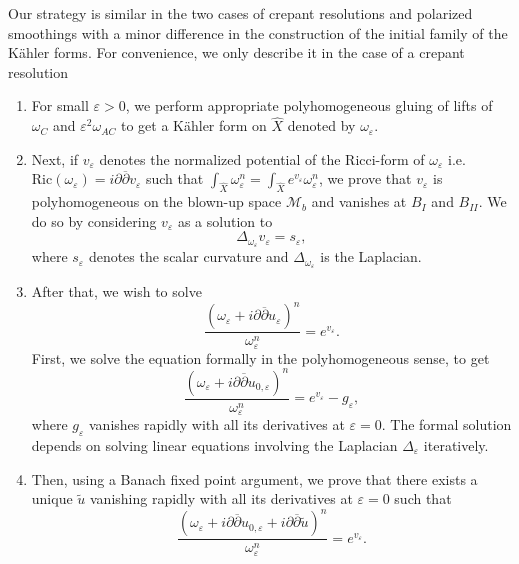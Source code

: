 \documentclass[a4paper,11pt]{article}
\begin{document}
Our strategy is similar in the two cases of crepant resolutions and polarized smoothings with a minor difference in the construction of the initial family of the Kähler forms. For convenience, we only describe it in the case of a crepant resolution 
 \begin{enumerate}
     \item For small $\varepsilon>0$, we perform appropriate polyhomogeneous gluing of lifts of $\omega_C$ and $\varepsilon^2 \omega_{AC}$ to get a Kähler form on $\hat{X}$ denoted by $\omega_\varepsilon$. 
     \item Next, if $v_\varepsilon$ denotes the normalized potential of the Ricci-form of $\omega_\varepsilon$ i.e. $\mathrm{Ric}(\omega_\varepsilon) = i \partial \overline{\partial} v_\varepsilon$ such that $\int_{\hat{X}} \omega_\varepsilon^n = \int_{\hat{X}} e^{v_\varepsilon} \omega_\varepsilon^n$,
     we prove that $v_\varepsilon$ is polyhomogeneous on the blown-up space $\mathcal{M}_b$ and vanishes at $B_I$ and $B_{II}$. We do so by considering $v_\varepsilon$ as a solution to
     $$
     \Delta_{\omega_{\varepsilon}} v_\varepsilon = s_{\varepsilon},
     $$
     where $s_{\varepsilon}$ denotes the scalar curvature and $\Delta_{\omega_\varepsilon}$ is the Laplacian.
     \item  After that, we wish to solve
     $$
     \frac{(\omega_\varepsilon + i \partial \overline{\partial} u_\varepsilon)^n}{\omega_\varepsilon^n} = e^{v_\varepsilon}. 
     $$
     First, we solve the equation formally in the polyhomogeneous sense, to get 
     $$
     \frac{(\omega_\varepsilon + i \partial \overline{\partial} u_{0,\varepsilon})^n}{\omega_\varepsilon^n} = e^{v_\varepsilon}-g_\varepsilon, 
     $$
     where $g_\varepsilon$ vanishes rapidly with all its derivatives at $\varepsilon=0$. The formal solution depends on solving linear equations involving the Laplacian $\Delta_\varepsilon$ iteratively.  
     \item Then, using a Banach fixed point argument, we prove that there exists a unique $\tilde u$ vanishing rapidly with all its derivatives at $\varepsilon=0$ such that 
     $$
     \frac{(\omega_\varepsilon + i \partial \overline{\partial} u_{0,\varepsilon} + i \partial \overline{\partial} \tilde u)^n}{\omega_\varepsilon^n} = e^{v_\varepsilon}.
     $$
 \end{enumerate}
\end{document}
